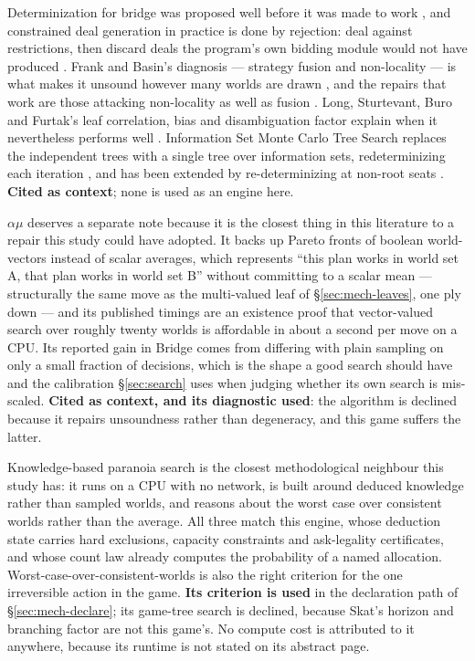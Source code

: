 Determinization for bridge was proposed well before it was made to work
\cite{levy}, and constrained deal generation in practice is done by rejection:
deal against restrictions, then discard deals the program's own bidding module
would not have produced \cite{ginsberg-gib}. Frank and Basin's diagnosis
--- strategy fusion and non-locality --- is what makes it unsound however many
worlds are drawn \cite{frank-basin-ai}, and the repairs that work are those
attacking non-locality as well as fusion \cite{frank-basin-aaai}. Long,
Sturtevant, Buro and Furtak's leaf correlation, bias and disambiguation factor
explain when it nevertheless performs well \cite{long-pimc}. Information Set
Monte Carlo Tree Search replaces the independent trees with a single tree over
information sets, redeterminizing each iteration \cite{cowling-ismcts}, and has
been extended by re-determinizing at non-root seats \cite{goodman-ris}.
\textbf{Cited as context}; none is used as an engine here.

$\alpha\mu$ \cite{cazenave2019alphamu} deserves a separate note because it is
the closest thing in this literature to a repair this study could have adopted.
It backs up Pareto fronts of boolean world-vectors instead of scalar averages,
which represents ``this plan works in world set A, that plan works in world set
B'' without committing to a scalar mean --- structurally the same move as the
multi-valued leaf of \S\ref{sec:mech-leaves}, one ply down --- and its published
timings are an existence proof that vector-valued search over roughly twenty
worlds is affordable in about a second per move on a CPU. Its reported gain in
Bridge comes from differing with plain sampling on only a small fraction of
decisions, which is the shape a good search should have and the calibration
\S\ref{sec:search} uses when judging whether its own search is mis-scaled.
\textbf{Cited as context, and its diagnostic used}: the algorithm is declined
because it repairs unsoundness rather than degeneracy, and this game suffers the
latter.

Knowledge-based paranoia search \cite{edelkamp2021paranoia} is the closest
methodological neighbour this study has: it runs on a CPU with no network, is
built around deduced knowledge rather than sampled worlds, and reasons about the
worst case over consistent worlds rather than the average. All three match this
engine, whose deduction state carries hard exclusions, capacity constraints and
ask-legality certificates, and whose count law already computes the probability
of a named allocation. Worst-case-over-consistent-worlds is also the right
criterion for the one irreversible action in the game. \textbf{Its criterion is
used} in the declaration path of \S\ref{sec:mech-declare}; its game-tree search
is declined, because Skat's horizon and branching factor are not this game's. No
compute cost is attributed to it anywhere, because its runtime is not stated on
its abstract page.


